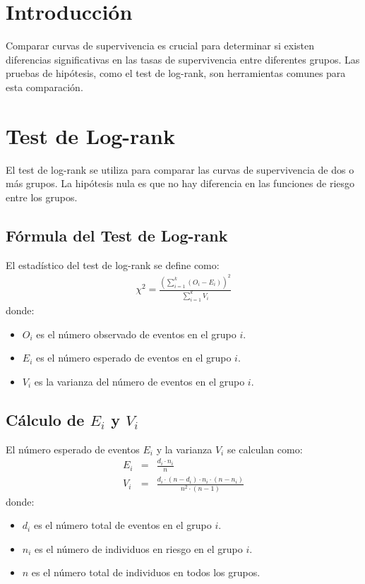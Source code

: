 \documentclass[a4paper]{report} %
\begin{document}
\section{Introducci\'on}
Comparar curvas de supervivencia es crucial para determinar si existen diferencias significativas en las tasas de supervivencia entre diferentes grupos. Las pruebas de hip\'otesis, como el test de log-rank, son herramientas comunes para esta comparaci\'on.

\section{Test de Log-rank}
El test de log-rank se utiliza para comparar las curvas de supervivencia de dos o más grupos. La hip\'otesis nula es que no hay diferencia en las funciones de riesgo entre los grupos.

\subsection{F\'ormula del Test de Log-rank}
El estad\'istico del test de log-rank se define como:
\begin{eqnarray*}
\chi^2 = \frac{\left(\sum_{i=1}^k (O_i - E_i)\right)^2}{\sum_{i=1}^k V_i}
\end{eqnarray*}
donde:
\begin{itemize}
    \item $O_i$ es el n\'umero observado de eventos en el grupo $i$.
    \item $E_i$ es el n\'umero esperado de eventos en el grupo $i$.
    \item $V_i$ es la varianza del n\'umero de eventos en el grupo $i$.
\end{itemize}

\subsection{Cálculo de $E_i$ y $V_i$}
El n\'umero esperado de eventos $E_i$ y la varianza $V_i$ se calculan como:
\begin{eqnarray*}
E_i &=& \frac{d_i \cdot n_i}{n} \\
V_i &=& \frac{d_i \cdot (n - d_i) \cdot n_i \cdot (n - n_i)}{n^2 \cdot (n - 1)}
\end{eqnarray*}
donde:
\begin{itemize}
    \item $d_i$ es el n\'umero total de eventos en el grupo $i$.
    \item $n_i$ es el n\'umero de individuos en riesgo en el grupo $i$.
    \item $n$ es el n\'umero total de individuos en todos los grupos.
\end{itemize}
\end{document}
